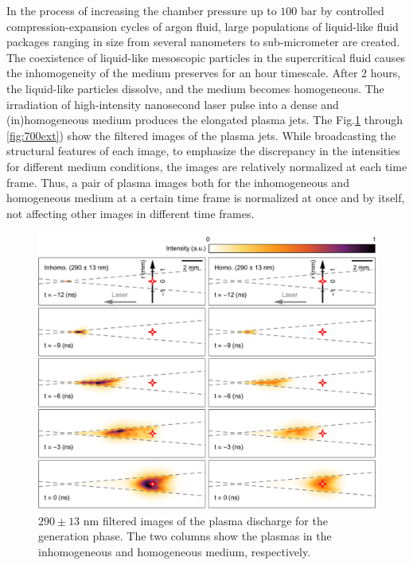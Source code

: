 In the process of increasing the chamber pressure up to $100 \text{ bar}$ by controlled compression-expansion cycles of argon fluid, large populations of liquid-like fluid packages ranging in size from several nanometers to sub-micrometer are created. The coexistence of liquid-like mesoscopic particles in the supercritical fluid causes the inhomogeneity of the medium preserves for an hour timescale. After 2 hours, the liquid-like particles dissolve, and the medium becomes homogeneous. The irradiation of high-intensity nanosecond laser pulse into a dense and (in)homogeneous medium produces the elongated plasma jets. The Fig.\ref{fig:290gen} through \ref{fig:700ext}) show the filtered images of the plasma jets. While broadcasting the structural features of each image, to emphasize the discrepancy in the intensities for different medium conditions, the images are relatively normalized at each time frame. Thus, a pair of plasma images both for the inhomogeneous and homogeneous medium at a certain time frame is normalized at once and by itself, not affecting other images in different time frames.

\begin{figure}[ht!]
\centering
\includegraphics[width=130mm]{figures/ch4/imaging/290gen.pdf}
\caption{$290\pm13 \text{ nm}$ filtered images of the plasma discharge for the generation phase. The two columns show the plasmas in the inhomogeneous and homogeneous medium, respectively.}
\label{fig:290gen}
\end{figure}

